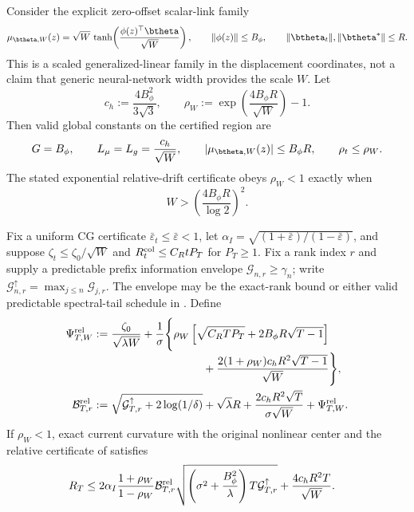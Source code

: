 \begin{corollary}
\label{cor:scaled-tanh-relative}
Consider the explicit zero-offset scalar-link family
\begin{equation}\label{eq:scaled-tanh-model}
 \mu_{\btheta,W}(z)=\sqrt W\,
 \tanh\!\left(\frac{\phi(z)^\top\btheta}{\sqrt W}\right),
 \qquad \|\phi(z)\|\le B_\phi,\qquad
 \|\btheta_t\|,\|\btheta^*\|\le R.
\end{equation}
This is a scaled generalized-linear family in the displacement coordinates,
not a claim that generic neural-network width provides the scale $W$.
Let
\[
 c_h:=\frac{4B_\phi^2}{3\sqrt3},\qquad
 \rho_W:=\exp\!\left(\frac{4B_\phi R}{\sqrt W}\right)-1.
\]
Then valid global constants on the certified region are
\begin{equation}\label{eq:scaled-tanh-constants}
 G=B_\phi,\qquad L_\mu=L_g=\frac{c_h}{\sqrt W},\qquad
 |\mu_{\btheta,W}(z)|\le B_\phi R,\qquad \rho_t\le\rho_W.
\end{equation}
The stated exponential relative-drift certificate obeys $\rho_W<1$ exactly
when
\begin{equation}\label{eq:scaled-tanh-rho-threshold}
 W>\left(\frac{4B_\phi R}{\log2}\right)^2.
\end{equation}

Fix a uniform CG certificate
$\bar\varepsilon_t\le\bar\varepsilon<1$, let
$\alpha_I=\sqrt{(1+\bar\varepsilon)/(1-\bar\varepsilon)}$, and suppose
$\zeta_t\le\zeta_0/\sqrt W$ and
$R_t^{\rm col}\le C_RtP_T$ for $P_T\ge1$.  Fix a rank index $r$ and supply a
predictable prefix information envelope $\mathcal G_{n,r}\ge\gamma_n$; write
$\mathcal G^\uparrow_{n,r}=\max_{j\le n}\mathcal G_{j,r}$.  The envelope may
be the exact-rank bound or either valid predictable spectral-tail schedule in
.  Define
\begin{align}
 \Psi^{\rm rel}_{T,W}:={}&\frac{\zeta_0}{\sqrt{\lambda W}}
 +\frac1\sigma\Biggl\{\rho_W
 \left[\sqrt{C_RTP_T}+2B_\phi R\sqrt{T-1}\right]
 \nonumber\\[-1mm]
 &\hspace{29mm}
 +\frac{2(1+\rho_W)c_hR^2\sqrt{T-1}}{\sqrt W}\Biggr\},
 \label{eq:scaled-tanh-relative-psi}\\
 \mathcal B^{\rm rel}_{T,r}:={}&
 \sqrt{\mathcal G^\uparrow_{T,r}+2\log(1/\delta)}+\sqrt\lambda R
 +\frac{2c_hR^2\sqrt T}{\sigma\sqrt W}
 +\Psi^{\rm rel}_{T,W}.
 \label{eq:scaled-tanh-relative-radius}
\end{align}
If $\rho_W<1$, exact current curvature with the original nonlinear center and
the relative certificate of  satisfies
\begin{equation}\label{eq:scaled-tanh-relative-regret}
\begin{aligned}
 R_T\le{}&2\alpha_I\frac{1+\rho_W}{1-\rho_W}
 \mathcal B^{\rm rel}_{T,r}
 \sqrt{\left(\sigma^2+\frac{B_\phi^2}{\lambda}\right)
 T\mathcal G^\uparrow_{T,r}}
 +\frac{4c_hR^2T}{\sqrt W}.
\end{aligned}
\end{equation}


\end{corollary}
